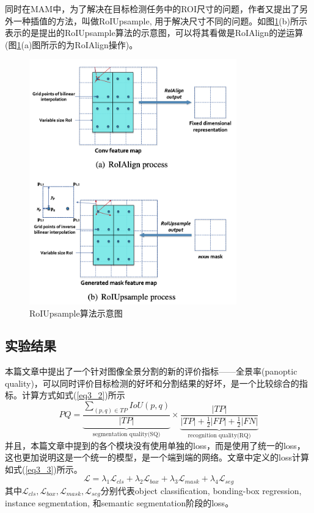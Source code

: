\documentclass[cn]{elegantbook}
\begin{document}
同时在MAM中，为了解决在目标检测任务中的ROI尺寸的问题，作者又提出了另外一种插值的方法，叫做RoIUpsample, 用于解决尺寸不同的问题。如图\ref{roiupsample}(b)所示表示的是提出的RoIUpsample算法的示意图，可以将其看做是RoIAlign的逆运算(图\ref{roiupsample}(a)图所示的为RoIAlign操作)。

\begin{figure}[!ht]
	\centering
	\includegraphics[width=0.8\textwidth]{images/roiupsample}
	\caption{\label{roiupsample}RoIUpsample算法示意图}
\end{figure}

\subsection{实验结果}
本篇文章中提出了一个针对图像全景分割的新的评价指标——全景率(panoptic quality)，可以同时评价目标检测的好坏和分割结果的好坏，是一个比较综合的指标。计算方式如式(\ref{eq3_2})所示
\begin{equation}
\label{eq3_2}
PQ=\underbrace{\frac{\sum_{(p,q)\in TP}IoU(p,q)}{|TP|}}_{\mbox{segmentation quality(SQ)}}\times\underbrace{\frac{|TP|}{|TP|+\frac{1}{2}|FP|+\frac{1}{2}|FN|}}_{\mbox{recognition quality(RQ)}}
\end{equation}
并且，本篇文章中提到的各个模块没有使用单独的loss，而是使用了统一的loss，这也更加说明这是一个统一的模型，是一个端到端的网络。文章中定义的loss计算如式(\ref{eq3_3})所示。
\begin{equation}
\label{eq3_3}
\mathcal{L}=\lambda_1\mathcal{L}_{cls}+\lambda_2\mathcal{L}_{box}+\lambda_3\mathcal{L}_{mask}+\lambda_4\mathcal{L}_{seg}
\end{equation}
其中$\mathcal{L}_{cls},\mathcal{L}_{box},\mathcal{L}_{mask},\mathcal{L}_{seg}$分别代表object classification, bonding-box regression, instance segmentation, 和semantic segmentation阶段的loss。
\end{document}
